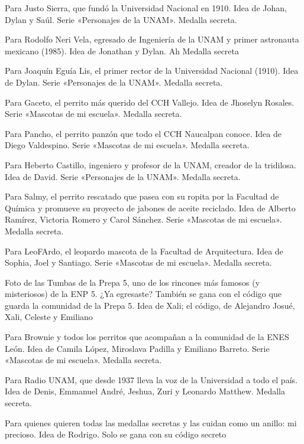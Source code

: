 \begin{description}[leftmargin=1.4cm, style=nextline]
  \item[JUST0S] Para Justo Sierra, que fundó la Universidad Nacional en 1910. Idea de Johan, Dylan y Saúl. Serie «Personajes de la UNAM». Medalla secreta.
  \item[4STR0N4UT4] Para Rodolfo Neri Vela, egresado de Ingeniería de la UNAM y primer astronauta mexicano (1985). Idea de Jonathan y Dylan. Ah Medalla secreta
  \item[3GU1AL1S] Para Joaquín Eguía Lis, el primer rector de la Universidad Nacional (1910). Idea de Dylan. Serie «Personajes de la UNAM». Medalla secreta.
  \item[G4C3T0] Para Gaceto, el perrito más querido del CCH Vallejo. Idea de Jhoselyn Rosales. Serie «Mascotas de mi escuela». Medalla secreta.
  \item[P4NCH0] Para Pancho, el perrito panzón que todo el CCH Naucalpan conoce. Idea de Diego Valdespino. Serie «Mascotas de mi escuela». Medalla secreta.
  \item[TR1D1L0S4] Para Heberto Castillo, ingeniero y profesor de la UNAM, creador de la tridilosa. Idea de David. Serie «Personajes de la UNAM». Medalla secreta.
  \item[S4LMY] Para Salmy, el perrito rescatado que pasea con su ropita por la Facultad de Química y promueve su proyecto de jabones de aceite reciclado. Idea de Alberto Ramírez, Victoria Romero y Carol Sánchez. Serie «Mascotas de mi escuela». Medalla secreta.
  \item[L30F4RD0] Para LeoFArdo, el leopardo mascota de la Facultad de Arquitectura. Idea de Sophia, Joel y Santiago. Serie «Mascotas de mi escuela». Medalla secreta.
  \item[TUMB4S5] Foto de las Tumbas de la Prepa 5, uno de los rincones más famosos (y misteriosos) de la ENP 5. ¿Ya egresaste? También se gana con el código que guarda la comunidad de la Prepa 5. Idea de Xali; el código, de Alejandro Josué, Xali, Celeste y Emiliano
  \item[BR0WN13] Para Brownie y todos los perritos que acompañan a la comunidad de la ENES León. Idea de Camila López, Miroslava Padilla y Emiliano Barreto. Serie «Mascotas de mi escuela». Medalla secreta.
  \item[R4D10UNAM] Para Radio UNAM, que desde 1937 lleva la voz de la Universidad a todo el país. Idea de Denis, Emmanuel André, Jeshua, Zuri y Leonardo Matthew. Medalla secreta.
  \item[M1PR3C10S0] Para quienes quieren todas las medallas secretas y las cuidan como un anillo: mi precioso. Idea de Rodrigo. Solo se gana con su código secreto

\end{description}
